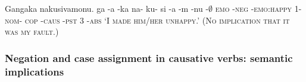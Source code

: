 \documentclass[12pt]{article}
\newcommand{\N}{\textipa{N}} %
\newcommand{\OO}{\textipa{O}} %
\newcommand{\B}{\textipa{B}} %
\newcommand{\0}{$\emptyset$} %
\newcommand{\D}{\scshape} %
\newcommand{\nom}{\D{nom}}
\newcommand{\abs}{\D{abs}}
\newcommand{\emo}{\D{emo}}
\newcommand{\cop}{\D{cop}}
\newcommand{\caus}{\D{caus}}
\newcommand{\pst}{\D{pst}}
\begin{document}
				\begin{example}
				\label{ex:fluids_abs}
						Gangaka nakusivamonu. 
						\gll ga -\N a -ka na- ku- si -\B a {-m\OO} -nu -\0				   
			   			{\emo} -{\D{neg}} -{\D{emo:happy}} 1- {\nom}- {\cop} {-\caus} {-\pst} 3 -\abs
						\glt `I made him/her unhappy.' (No implication that it was my fault.)
						\glend
				\end{example}

			\subsubsection{Negation and case assignment in causative verbs: semantic implications}
\end{document}
